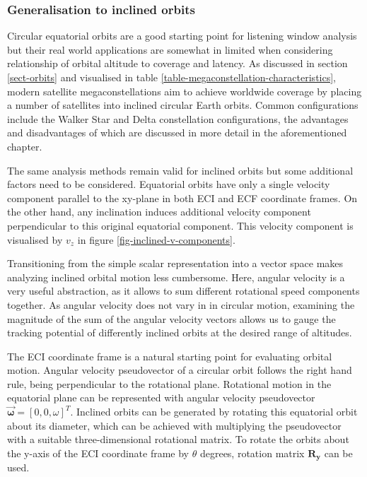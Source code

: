 \documentclass[english, 12pt, a4paper, elec, utf8, a-1b, online]{aaltothesis}
\begin{document}
\subsubsection{Generalisation to inclined orbits}

Circular equatorial orbits are a good starting point for listening window analysis but their real world applications are somewhat in limited when considering relationship of orbital altitude to coverage and latency.
As discussed in section \ref{sect-orbits} and visualised in table \ref{table-megaconstellation-characteristics}, modern satellite megaconstellations aim to achieve worldwide coverage by placing a number of satellites into inclined circular Earth orbits.
Common configurations include the Walker Star and Delta constellation configurations, the advantages and disadvantages of which are discussed in more detail in the aforementioned chapter.

The same analysis methods remain valid for inclined orbits but some additional factors need to be considered.
Equatorial orbits have only a single velocity component parallel to the xy-plane in both ECI and ECF coordinate frames.
On the other hand, any inclination induces additional velocity component perpendicular to this original equatorial component.
This velocity component is visualised by $v_z$ in figure \ref{fig-inclined-v-components}.

Transitioning from the simple scalar representation into a vector space makes analyzing inclined orbital motion less cumbersome.
Here, angular velocity is a very useful abstraction, as it allows to sum different rotational speed components together.
As angular velocity does not vary in in circular motion, examining the magnitude of the sum of the angular velocity vectors allows us to gauge the tracking potential of differently inclined orbits at the desired range of altitudes.

The ECI coordinate frame is a natural starting point for evaluating orbital motion.
Angular velocity pseudovector of a circular orbit follows the right hand rule, being perpendicular to the rotational plane.
Rotational motion in the equatorial plane can be represented with angular velocity pseudovector $\bm{\vec{\omega}} = [0,0,\omega]^T$.
Inclined orbits can be generated by rotating this equatorial orbit about its diameter, which can be achieved with multiplying the pseudovector with a suitable three-dimensional rotational matrix.
To rotate the orbits about the y-axis of the ECI coordinate frame by $\theta$ degrees, rotation matrix $\bm{R_y}$ can be used.
\end{document}
